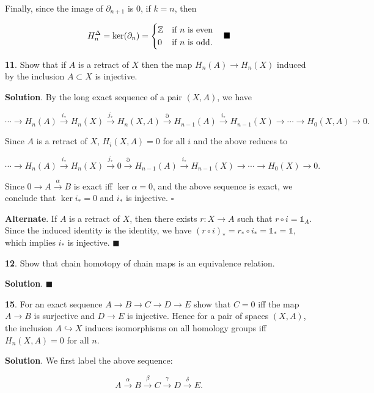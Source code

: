 \documentclass{article}
\newcommand{\Z}{\mathbb{Z}}
\newcommand{\identity}{\mathds{1}}
\begin{document}
Finally, since the image of $\partial_{n+1}$ is 0, if $k = n$, then

$$H^{\Delta}_{n} = \ker (\partial_{n}) = \begin{cases}\Z & \textnormal{if $n$ is even}\\ 0 & \textnormal{if $n$ is odd}.\end{cases}\quad \blacksquare$$
\bigskip

\textbf{11}. Show that if $A$ is a retract of $X$ then the map $H_{n}(A)\to H_{n}(X)$ induced by the inclusion $A\subset X$ is injective.
\medskip

\textbf{Solution}. By the long exact sequence of a pair $(X, A)$, we have

$$\cdots \to H_{n}(A)\xrightarrow{i_{\ast}} H_{n}(X)\xrightarrow{j_{\ast}}H_{n}(X, A)\xrightarrow{\partial} H_{n-1}(A)\xrightarrow{i_{\ast}} H_{n-1}(X)\to \cdots \to H_{0}(X, A)\to 0.$$

Since $A$ is a retract of $X$, $H_{i}(X, A) = 0$ for all $i$ and the above reduces to

$$\cdots \to H_{n}(A)\xrightarrow{i_{\ast}} H_{n}(X)\xrightarrow{j_{\ast}}0\xrightarrow{\partial} H_{n-1}(A)\xrightarrow{i_{\ast}} H_{n-1}(X)\to \cdots \to H_{0}(X)\to 0.$$

Since $0\to A\xrightarrow{\alpha} B$ is exact iff $\ker \alpha = 0$, and the above sequence is exact, we conclude that $\ker i_{\ast} = 0$ and $i_{\ast}$ is injective. $\square$
\medskip

\textbf{Alternate}. If $A$ is a retract of $X$, then there exists $r: X\to A$ such that $r\circ i = \identity_{A}$. Since the induced identity is the identity, we have $(r\circ i)_{\ast} = r_{\ast}\circ i_{\ast} = \identity_{\ast} = \identity$, which implies $i_{\ast}$ is injective. $\blacksquare$
\bigskip
\bigskip

\textbf{12}. Show that chain homotopy of chain maps is an equivalence relation.
\medskip

\textbf{Solution}. $\blacksquare$
\bigskip
\bigskip

\textbf{15}. For an exact sequence $A\to B\to C\to D\to E$ show that $C = 0$ iff the map $A\to B$ is surjective and $D\to E$ is injective. Hence for a pair of spaces $(X, A)$, the inclusion $A\hookrightarrow X$ induces isomorphisms on all homology groups iff $H_{n}(X, A) = 0$ for all $n$.
\medskip

\textbf{Solution}. We first label the above sequence:

$$A\xrightarrow{\alpha} B\xrightarrow{\beta} C\xrightarrow{\gamma} D\xrightarrow{\delta} E.$$
\end{document}
